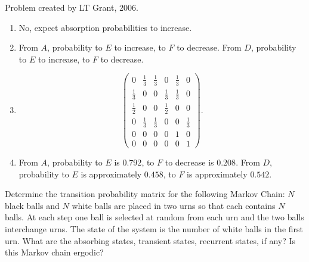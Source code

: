 \documentclass[12pt]{article}
\begin{document}
\begin{solution}
    Problem created by LT Grant, 2006.
    \begin{enumerate}[label=(\alph*)]
    \item
        No, expect absorption probabilities to increase.
    \item
        From \( A \), probability to \( E \) to increase, to \( F \) to
        decrease. From \( D \), probability to \( E \) to increase, to \(
        F \) to decrease.
    \item
        \[
            \begin{pmatrix}
                0 & \frac{1}{3} & \frac{1}{3} & 0 & \frac{1}{3} & 0\\
                \frac{1}{3} & 0 & 0 & \frac{1}{3} & \frac{1}{3} & 0\\
                \frac{1}{2} & 0 & 0 & \frac{1}{2} & 0 & 0\\
                0 & \frac{1}{3} & \frac{1}{3} & 0 & 0 & \frac{1}{3}\\
                0 & 0 & 0 & 0 & 1 & 0\\
                0 & 0 & 0 & 0 & 0 & 1
            \end{pmatrix}
            .
        \]
    \item
        From \( A \), probability to \( E \) is \( 0.792 \), to \( F \)
        to decrease is \( 0.208 \). From \( D \), probability to \( E \)
        is approximately \( 0.458 \), to \( F \) is approximately \(
        0.542 \).
\end{enumerate}
\end{solution}
\begin{exercise}
    Determine the transition probability matrix for the following Markov
    Chain:  \( N \) black balls and \( N \) white balls are placed in
    two urns so that each contains \( N \) balls.  At each step one ball
    is selected at random from each urn and the two balls interchange
    urns.  The state of the system is the number of white balls in the
    first urn.  What are the absorbing states, transient states,
    recurrent states, if any?  Is this Markov chain ergodic?
\end{exercise}
\end{document}
